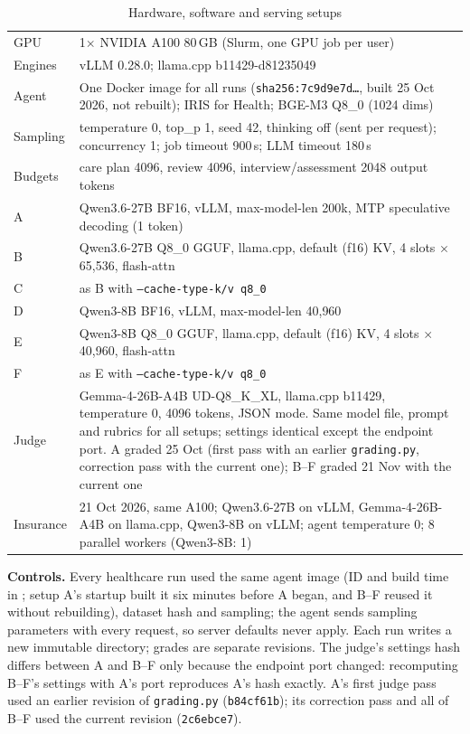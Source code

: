\documentclass[conference]{IEEEtran}
\newcommand{\tagurl}[1]{\href{https://github.com/zaki-cs25/Dat-Project/tree/cs5903-final-2026/#1}{\texttt{\detokenize{#1}}}}
\begin{document}
\begin{table}[t]
\caption{Hardware, software and serving setups}
\label{tab:setup}
\centering\scriptsize
\begin{tabularx}{\columnwidth}{@{}>{\raggedright\arraybackslash}p{1.45cm}X@{}}
\toprule
GPU & 1$\times$ NVIDIA A100 80\,GB (Slurm, one GPU job per user) \\
Engines & vLLM 0.28.0; llama.cpp b11429-d81235049 \\
Agent & One Docker image for all runs (\texttt{sha256:7c9d9e7d\ldots}, built 25 Oct 2026, not rebuilt); IRIS for Health; BGE-M3 Q8\_0 (1024 dims) \\
Sampling & temperature 0, top\_p 1, seed 42, thinking off (sent per request); concurrency 1; job timeout 900\,s; LLM timeout 180\,s \\
Budgets & care plan 4096, review 4096, interview/assessment 2048 output tokens \\
\midrule
A & Qwen3.6-27B BF16, vLLM, max-model-len 200k, MTP speculative decoding (1 token) \\
B & Qwen3.6-27B Q8\_0 GGUF, llama.cpp, default (f16) KV, 4 slots $\times$ 65{,}536, flash-attn \\
C & as B with \texttt{--cache-type-k/v q8\_0} \\
D & Qwen3-8B BF16, vLLM, max-model-len 40{,}960 \\
E & Qwen3-8B Q8\_0 GGUF, llama.cpp, default (f16) KV, 4 slots $\times$ 40{,}960, flash-attn \\
F & as E with \texttt{--cache-type-k/v q8\_0} \\
\midrule
Judge & Gemma-4-26B-A4B UD-Q8\_K\_XL, llama.cpp b11429, temperature 0, 4096 tokens, JSON mode. Same model file, prompt and rubrics for all setups; settings identical except the endpoint port. A graded 25 Oct (first pass with an earlier \texttt{grading.py}, correction pass with the current one); B--F graded 21 Nov with the current one \\
\midrule
Insurance & 21 Oct 2026, same A100; Qwen3.6-27B on vLLM, Gemma-4-26B-A4B on llama.cpp, Qwen3-8B on vLLM; agent temperature 0; 8 parallel workers (Qwen3-8B: 1) \\
\bottomrule
\end{tabularx}
\end{table}

\textbf{Controls.} Every healthcare run used the same agent image (ID and build time in \tagurl{evaluation/environment}; setup A's startup built it six minutes before A began, and B--F reused it without rebuilding), dataset hash and sampling; the agent sends sampling parameters with every request, so server defaults never apply. Each run writes a new immutable directory; grades are separate revisions. The judge's settings hash differs between A and B--F only because the endpoint port changed: recomputing B--F's settings with A's port reproduces A's hash exactly. A's first judge pass used an earlier revision of \texttt{grading.py} (\texttt{b84cf61b}); its correction pass and all of B--F used the current revision (\texttt{2c6ebce7}).
\end{document}
